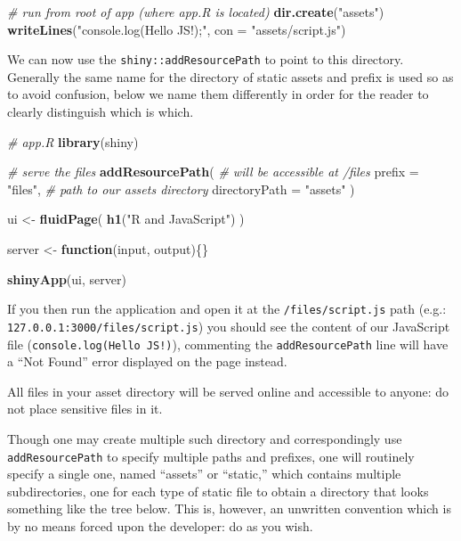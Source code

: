 \documentclass[
]{krantz}
\makeatletter
\newenvironment{Shaded}{\begin{snugshade}}{\end{snugshade}}
\newcommand{\CommentTok}[1]{\textcolor[rgb]{0.37,0.37,0.37}{\textit{#1}}}
\newcommand{\ControlFlowTok}[1]{\textcolor[rgb]{0.27,0.27,0.27}{\textbf{#1}}}
\newcommand{\DataTypeTok}[1]{\textcolor[rgb]{0.27,0.27,0.27}{#1}}
\newcommand{\KeywordTok}[1]{\textcolor[rgb]{0.27,0.27,0.27}{\textbf{#1}}}
\newcommand{\NormalTok}[1]{#1}
\newcommand{\StringTok}[1]{\textcolor[rgb]{0.5,0.5,0.5}{#1}}
\newenvironment{kframe}{%
\medskip{}
\setlength{\fboxsep}{.8em}
 \def\at@end@of@kframe{}%
 \ifinner\ifhmode%
  \def\at@end@of@kframe{\end{minipage}}%
  \begin{minipage}{\columnwidth}%
 \fi\fi%
 \def\FrameCommand##1{\hskip\@totalleftmargin \hskip-\fboxsep
 \colorbox{shadecolor}{##1}\hskip-\fboxsep
     \hskip-\linewidth \hskip-\@totalleftmargin \hskip\columnwidth}%
 \MakeFramed {\advance\hsize-\width
   \@totalleftmargin\z@ \linewidth\hsize
   \@setminipage}}%
 {\par\unskip\endMakeFramed%
 \at@end@of@kframe}
\renewenvironment{Shaded}{\begin{kframe}}{\end{kframe}}
\makeatother
\begin{document}
\begin{Shaded}
\begin{Highlighting}[]
\CommentTok{\# run from root of app (where app.R is located)}
\KeywordTok{dir.create}\NormalTok{(}\StringTok{"assets"}\NormalTok{)}
\KeywordTok{writeLines}\NormalTok{(}\StringTok{"console.log(\textquotesingle{}Hello JS!\textquotesingle{});"}\NormalTok{, }\DataTypeTok{con =} \StringTok{"assets/script.js"}\NormalTok{)}
\end{Highlighting}
\end{Shaded}

We can now use the \texttt{shiny::addResourcePath} to point to this directory. Generally the same name for the directory of static assets and prefix is used so as to avoid confusion, below we name them differently in order for the reader to clearly distinguish which is which.

\begin{Shaded}
\begin{Highlighting}[]
\CommentTok{\# app.R}
\KeywordTok{library}\NormalTok{(shiny)}

\CommentTok{\# serve the files}
\KeywordTok{addResourcePath}\NormalTok{(}
  \CommentTok{\# will be accessible at /files}
  \DataTypeTok{prefix =} \StringTok{"files"}\NormalTok{, }
  \CommentTok{\# path to our assets directory}
  \DataTypeTok{directoryPath =} \StringTok{"assets"}
\NormalTok{)}

\NormalTok{ui <{-}}\StringTok{ }\KeywordTok{fluidPage}\NormalTok{(}
  \KeywordTok{h1}\NormalTok{(}\StringTok{"R and JavaScript"}\NormalTok{)}
\NormalTok{)}

\NormalTok{server <{-}}\StringTok{ }\ControlFlowTok{function}\NormalTok{(input, output)\{\}}

\KeywordTok{shinyApp}\NormalTok{(ui, server)}
\end{Highlighting}
\end{Shaded}

If you then run the application and open it at the \texttt{/files/script.js} path (e.g.: \texttt{127.0.0.1:3000/files/script.js}) you should see the content of our JavaScript file (\texttt{console.log(\textquotesingle{}Hello\ JS!\textquotesingle{})}), commenting the \texttt{addResourcePath} line will have a ``Not Found'' error displayed on the page instead.

All files in your asset directory will be served online and accessible to anyone: do not place sensitive files in it.

Though one may create multiple such directory and correspondingly use \texttt{addResourcePath} to specify multiple paths and prefixes, one will routinely specify a single one, named ``assets'' or ``static,'' which contains multiple subdirectories, one for each type of static file to obtain a directory that looks something like the tree below. This is, however, an unwritten convention which is by no means forced upon the developer: do as you wish.
\end{document}
